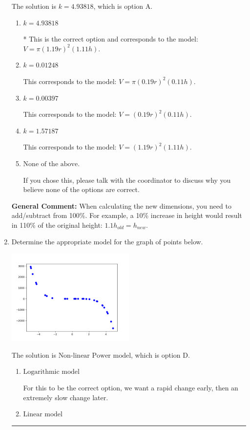 \documentclass{extbook}[14pt]
\newcommand{\litem}[1]{\item #1

\rule{\textwidth}{0.4pt}}
\begin{document}
\begin{enumerate}
{The solution is \( k = 4.93818 \), which is option A.\begin{enumerate}[label=\Alph*.]
\item \( k = 4.93818 \)

* This is the correct option and corresponds to the model: $V = \pi (1.19 r)^2 (1.11 h)$.
\item \( k = 0.01248 \)

This corresponds to the model: $V = \pi (0.19 r)^2 (0.11 h)$.
\item \( k = 0.00397 \)

This corresponds to the model: $V = (0.19 r)^2 (0.11 h)$.
\item \( k = 1.57187 \)

This corresponds to the model: $V = (1.19 r)^2 (1.11 h)$.
\item \( \text{None of the above.} \)

If you chose this, please talk with the coordinator to discuss why you believe none of the options are correct.
\end{enumerate}

\textbf{General Comment:} When calculating the new dimensions, you need to add/subtract from 100\%. For example, a 10\% increase in height would result in 110\% of the original height: $1.1h_{old} = h_{new}$.
}
\litem{
Determine the appropriate model for the graph of points below.

\begin{center}
    \includegraphics[width=0.5\textwidth]{../Figures/identifyModelGraph12C.png}
\end{center}




The solution is \( \text{Non-linear Power model} \), which is option D.\begin{enumerate}[label=\Alph*.]
\item \( \text{Logarithmic model} \)

For this to be the correct option, we want a rapid change early, then an extremely slow change later.
\item \( \text{Linear model} \)


\end{enumerate}}
\end{enumerate}
\end{document}
